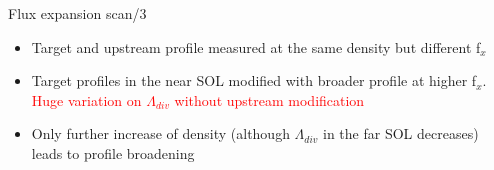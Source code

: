 \documentclass[10pt, compress]{beamer}
\newcommand\Fontvi{\fontsize{8}{7.2}\selectfont}
\begin{document}
\begin{frame}{Flux expansion scan/3}
  \vspace{-1cm}
\Fontvi
      \begin{itemize}
      \item Target and upstream profile measured at the same density
        but different f$_x$
      \item<3-> Target profiles in the near SOL modified with broader profile at higher
        f$_x$. \textcolor{red}{Huge variation on $\Lambda_{div}$
          without upstream modification}
      \item<4|only@4> \textcolor{ta3chameleon}{Only further increase
          of density (although $\Lambda_{div}$ in the far SOL
          decreases) leads to profile broadening}
      \end{itemize}
\end{frame}
\end{document}

